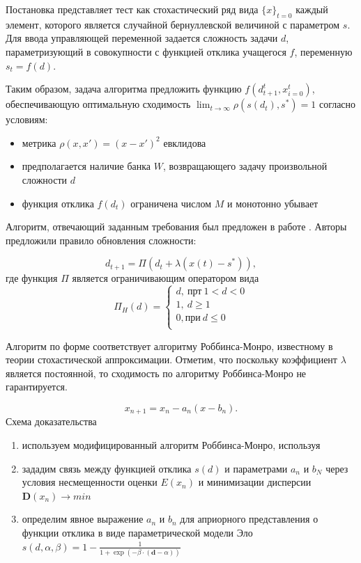 Постановка представляет тест как стохастический ряд вида $\{x\}_{t=0}$ каждый элемент, которого является случайной бернуллевской величиной с параметром $s$. 
Для ввода управляющей переменной задается сложность задачи $d$, параметризующий в совокупности с функцией отклика учащегося $f$, переменную $s_t = f(d)$.

 Таким образом, задача алгоритма предложить функцию $f(d_{t+1}^t,{x}_{i=0}^t)$, обеспечивающую оптимальную сходимость $\lim_{t \rightarrow \infty} \rho(s(d_t),s^*) =1$ согласно условиям:
 \begin{itemize}
    \item метрика $\rho(x,x') = (x-x')^2$ евклидова
    \item предполагается наличие банка $W$, возвращающего задачу произвольной сложности $d$
    \item функция отклика $f(d_t)$ ограничена числом $M$ и монотонно убывает
\end{itemize}

Алгоритм, отвечающий заданным требования  был предложен в работе \cite{yazidi2020balanced}. Авторы предложили правило обновления сложности:

\begin{equation}
    d_{t+1} = \Pi(d_t+\lambda (x(t) -s^*)),
    \label{yazidi}
\end{equation}
где функция $\Pi$ является ограничивающим оператором вида
\begin{equation}
    \Pi_H(d) = \left\{
        \begin{array}{ll}
            d,\ \text{прт}\ 1<d<0 \\
            1,\ d\ge 1\\
            0, \text{при} \ d \le 0\\
        \end{array}
    \right.
\end{equation}

Алгоритм по форме соответствует алгоритму Роббинса-Монро\cite{robbins1951stochastic}, известному в теории стохастической аппроксимации. 
Отметим, что поскольку коэффициент $\lambda$ является постоянной, то сходимость по алгоритму Роббинса-Монро не гарантируется.


\begin{equation}
    x_{n+1} = x_{n} - a_n(x -b_n).
\end{equation}
Схема доказательства \begin{enumerate}
    \item используем модифицированный алгоритм Роббинса-Монро, используя 
    \item зададим связь между функцией отклика $s(d)$ и параметрами $a_n$ и $b_N$ через условия несмещенности оценки $E(x_n)$ и
минимизации дисперсии $\mathbf{D}(x_n) \rightarrow min$  \cite{hu1997strong} \cite{hu1998sequential}
    \item определим явное выражение $a_n$ и $b_n$ для априорного представления о функции отклика в виде параметрической модели Эло $s(d,\alpha,\beta) = 1 - \frac{1}{1+\exp\left(-\beta \cdot(\mathbf{d} -\alpha)\right)}$
\end{enumerate}

